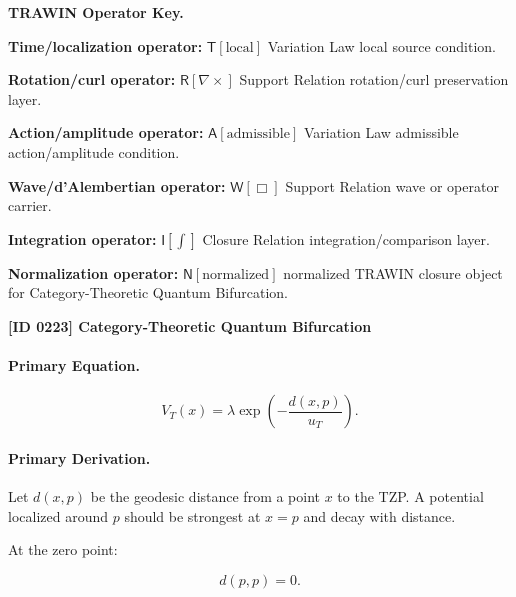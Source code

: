 \par\vspace{0.45\baselineskip}
\noindent\begin{minipage}[t]{\linewidth}
\begingroup
\small
\raggedright
\textbf{TRAWIN Operator Key.}\par
\noindent\textbf{Time/localization operator:} $\mathsf{T}\!\left[\mathrm{local}\right]$ Variation Law local source condition.\par
\noindent\textbf{Rotation/curl operator:} $\mathsf{R}\!\left[\nabla\times\right]$ Support Relation rotation/curl preservation layer.\par
\noindent\textbf{Action/amplitude operator:} $\mathsf{A}\!\left[\mathrm{admissible}\right]$ Variation Law admissible action/amplitude condition.\par
\noindent\textbf{Wave/d'Alembertian operator:} $\mathsf{W}\!\left[\Box\right]$ Support Relation wave or operator carrier.\par
\noindent\textbf{Integration operator:} $\mathsf{I}\!\left[\int\right]$ Closure Relation integration/comparison layer.\par
\noindent\textbf{Normalization operator:} $\mathsf{N}\!\left[\mathrm{normalized}\right]$ normalized TRAWIN closure object for Category-Theoretic Quantum Bifurcation.\par
\endgroup
\end{minipage}

\clearpage
\noindent\textbf{[ID 0223] Category-Theoretic Quantum Bifurcation}\par
\vspace{0.35em}
\paragraph{Primary Equation.}
\begin{equation}
V_T(x)
=
\lambda
\exp\left(
-\frac{d(x,p)}{u_T}
\right).
\end{equation}

\paragraph{Primary Derivation.}
Let $d(x,p)$ be the geodesic distance from a point $x$ to the TZP.  
A potential localized around $p$ should be strongest at $x=p$ and decay with distance.

At the zero point:

\begin{equation}
d(p,p)=0 .
\end{equation}

